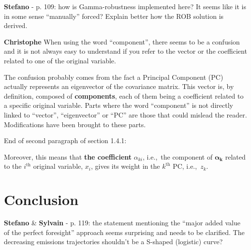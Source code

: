 \documentclass[12pt,a4paper]{article}
\def\ie{i.e.,\ }
\begin{document}
\begin{mdframed}[style=comment] %
{\color{orange} \textbf{Stefano}} - p. 109: how is Gamma-robustness implemented here? It seems like it is in some sense “manually” forced? Explain better how the ROB solution is derived.
\end{mdframed}

\noindent 

\begin{mdframed}[style=manuscript] %

\end{mdframed}

\begin{mdframed}[style=comment] %
{\color{violet} \textbf{Christophe}} When using the word ``component'', there seems to be a confusion and it is not always easy to understand if you refer to the vector or the coefficient related to one of the original variable.
\end{mdframed}

\noindent The confusion probably comes from the fact a Principal Component (PC) actually represents an eigenvector of the covariance matrix. This vector is, by definition, composed of \textbf{components}, each of them being a coefficient related to a specific original variable. Parts where the word ``component'' is not directly linked to ``vector'', ``eigenvector'' or ``PC'' are those that could mislead the reader. Modifications have been brought to these parts.

{\color{blue} End of second paragraph of section 1.4.1}:

\begin{mdframed}[style=manuscript] %
Moreover, this means that \textbf{the coefficient} $\alpha_{ki}$, \ie the component of $\bm{\alpha}_{\mathbf{k}}$ related to the $i^{\text{th}}$ original variable, $x_i$,  gives its weight in the $k^{\text{th}}$ PC, \ie $z_k$. 
\end{mdframed}

\section{Conclusion}
\label{Conclusion}

\begin{mdframed}[style=comment] %
{\color{orange} \textbf{Stefano}} \& {\color{purple} \textbf{Sylvain}} - p. 119: the statement mentioning the ``major added value of the perfect foresight'' approach seems surprising and needs to be clarified.  The decreasing  emissions trajectories shouldn't be a S-shaped (logistic) curve?
\end{mdframed}
\end{document}
